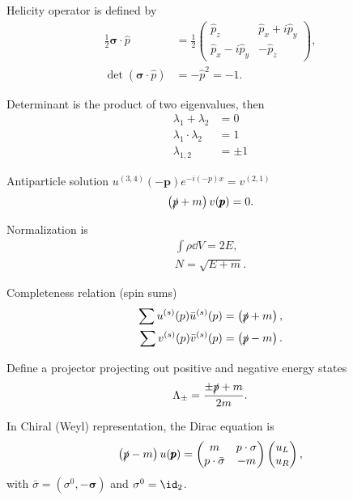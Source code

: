 Helicity operator is defined by
\begin{align}
   \frac{1}{2} \pmb{\sigma} \cdot {\hat{p}} &= \frac{1}{2} \begin{pmatrix} \hat{p}_z & \hat{p}_x + i\hat{p}_y \\ \hat{p}_x -i \hat{p}_y & -\hat{p}_z\end{pmatrix}, \\
   \det(\pmb{\sigma} \cdot \hat{p}) &= - \hat{p}^2 = - 1.
\end{align}
  
Determinant is the product of two eigenvalues, then
\begin{align*}
   \lambda_1 + \lambda_2 &= 0 \\
   \lambda_1 \cdot \lambda_2 &= 1 \\
   \lambda_{1,2} &= \pm 1
\end{align*}

Antiparticle solution $u^{(3,4)}(-\pmb{p}) e^{-i(-p)x} = v^{(2,1)}$
\begin{align}
   \left( \slashed{p} + m \right)v(\pmb{p}) = 0.
\end{align}

Normalization is
\begin{align}
   \int \rho \dd{V} = 2E, \\
   N = \sqrt{E+m}.
\end{align}

Completeness relation (spin sums)
\begin{align}
   \sum u^{(s)}(p) \bar{u}^{(s)}(p ) = \left( \slashed{p} + m \right), \\
   \sum v^{(s)}(p) \bar{v}^{(s)}(p ) = \left( \slashed{p} - m \right).
\end{align}

Define a projector projecting out positive and negative energy states
\begin{align}
   \Lambda_{\pm} = \frac{\pm \slashed{p} + m}{2m}.
\end{align}

In Chiral (Weyl) representation, the Dirac equation is
\begin{align}
   \left( \slashed{p} - m \right) u(\pmb{p}) = \begin{pmatrix} m & p \cdot \sigma \\ p \cdot \bar{\sigma} & -m \end{pmatrix} \begin{pmatrix} u_L \\ u_R\end{pmatrix},
\end{align}
with $\bar{\sigma} = (\sigma^0 , -\pmb{\sigma})$ and $\sigma^0 = \id_2$.

